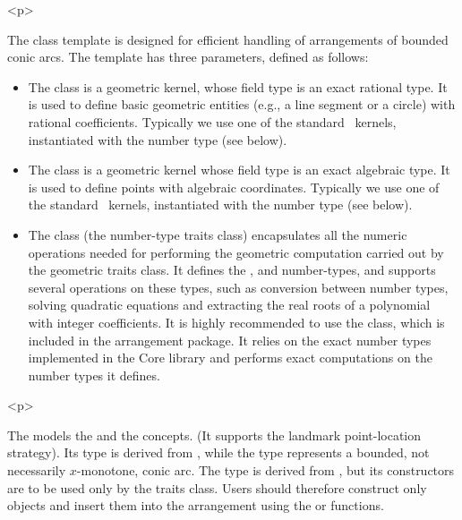 \begin{ccHtmlOnly}<p>\end{ccHtmlOnly}
The  class
template is designed for efficient handling of arrangements of
bounded conic arcs. The template has three parameters, defined as
follows:
\begin{itemize}
\item The  class is a geometric kernel, whose field
type is an exact rational type. It is used to define basic
geometric entities (e.g., a line segment or a circle) with rational
coefficients. Typically we use one of the standard \cgal\ kernels,
instantiated with the number type  (see
below).
%
\item The  class is a geometric kernel whose field
type is an exact algebraic type. It is used to define points with
algebraic coordinates. Typically we use one of the standard
\cgal\ kernels, instantiated with the number type
 (see below).
%
\item The  class (the number-type traits class)
encapsulates all the numeric operations needed for performing the
geometric computation carried out by the geometric traits class.
It defines the ,  and 
number-types, and supports several operations on these types, such
as conversion between number types, solving quadratic equations
and extracting the real roots of a polynomial with integer
coefficients. It is highly recommended to use the
 class, which is included in the
arrangement package. It relies on the exact number types
implemented in the {\sc Core} library and performs exact
computations on the number types it defines.
\end{itemize}

\begin{ccHtmlOnly}<p>\end{ccHtmlOnly}
The  models the  and
the  concepts. (It supports
the landmark point-location strategy). Its  type is
derived from , while the 
type represents a bounded, not necessarily $x$-monotone, conic arc.
The  type is derived from ,
but its constructors are to be used only by the traits class.
Users should therefore construct only  objects and
insert them into the arrangement using the 
or  functions.

